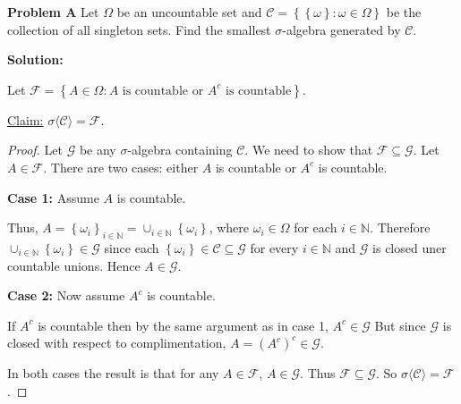 \documentclass[12pt]{article}
\begin{document}
{\bf Problem A} Let $\Omega$ be an uncountable set and $\mathcal{C} = \left\{ \left\{ \omega \right\} : \omega \in \Omega \right\}$ be the collection
of all singleton sets. Find the smallest $\sigma$-algebra generated by $\mathcal{C}$.

{\bf Solution:}

Let $\mathcal{F} = \left\{ A \in \Omega : A \text{ is countable or } A^{c} \text{ is countable} \right\}$.

\underline{Claim:} $\sigma \langle\mathcal{C}\rangle = \mathcal{F}$.

\begin{proof}
Let $\mathcal{G}$ be any $\sigma$-algebra containing $\mathcal{C}$. We need to show that $\mathcal{F} \subseteq \mathcal{G}$. Let $A \in \mathcal{F}$.
There are two cases: either $A$ is countable or $A^{c}$ is countable.

{\bf Case 1:} Assume $A$ is countable.

Thus, $A = \left\{ \omega_{i} \right\}_{i\in\mathbb{N}} = \cup_{i\in\mathbb{N}}\left\{ \omega_{i} \right\}$, where $\omega_{i} \in \Omega$ for each $i
\in \mathbb{N}$. Therefore $\cup_{i\in\mathbb{N}}\left\{ \omega_{i} \right\} \in \mathcal{G}$ since each $\left\{ \omega_{i} \right\} \in \mathcal{C}
\subseteq \mathcal{G}$ for every $i \in \mathbb{N}$ and $\mathcal{G}$ is closed uner countable unions. Hence $A \in \mathcal{G}$.

{\bf Case 2:} Now assume $A^{c}$ is countable.

If $A^{c}$ is countable then by the same argument as in case 1, $A^{c} \in \mathcal{G}$ But since $\mathcal{G}$ is closed with respect to
complimentation, $A = (A^{c})^{c} \in \mathcal{G}$. 

In both cases the result is that for any $A \in \mathcal{F}$, $A \in \mathcal{G}$. Thus $\mathcal{F} \subseteq \mathcal{G}$. So $\sigma\langle
\mathcal{C} \rangle = \mathcal{F}$.
\end{proof}
\end{document}
